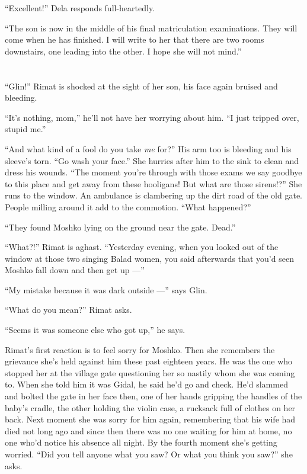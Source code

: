 \documentclass[twoside,11pt,openany]{book}
\begin{document}
``Excellent!'' Dela responds full-heartedly.

``The son is now in the middle of his final matriculation examinations. They will come when he has finished. I will
write to her that there are two rooms downstairs, one leading into the other. I hope she will not mind.''


\bigskip

\chapter{}

``Glin!'' Rimat is shocked at the sight of her son, his face again bruised and bleeding.

``It's nothing, mom,'' he'll not have her worrying about him. ``I just tripped over, stupid
me.''

``And what kind of a fool do you take \textit{me} for?'' His arm too is bleeding and his
sleeve's torn. ``Go wash your face.'' She hurries after him to the sink to clean and dress
his wounds. ``The moment you're through with those exams we say goodbye to this place and get away from
these hooligans! But what are those sirens!?'' She runs to the window. An ambulance is clambering up the
dirt road of the old gate. People milling around it add to the commotion. ``What happened?''

``They found Moshko lying on the ground near the gate. Dead.''

``What?!'' Rimat is aghast. ``Yesterday evening, when you
looked out of the window at those two singing Balad women, you said afterwards that you'd seen Moshko fall down and
then get up ---''

``My mistake because it was dark outside ---'' says Glin.

``What do you mean?'' Rimat asks.

``Seems it was someone else who got up,'' he says.

Rimat's first reaction is to feel sorry for Moshko. Then she remembers the grievance she's held against him these
past{ }eighteen years. He was the one who stopped her at the village gate questioning her so nastily
whom she was coming to. When she told him it was Gidal, he said he'd go and check. He'd slammed and bolted the gate in
her face then, one of her hands gripping the handles of the baby's cradle, the other holding the violin case, a
rucksack full of clothes on her back. Next moment she was sorry for him again, remembering that  his wife had died not
long ago and since then there was no one waiting for him at home, no one who'd notice his absence all night. By the
fourth moment she's getting worried. ``Did you tell anyone what you saw? Or what you think you
saw?''  she asks.
\end{document}
